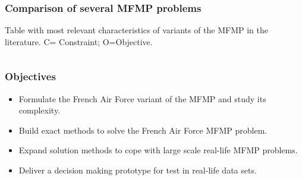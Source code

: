 \begin{frame}
\frametitle{\textbf{Comparison of several MFMP problems}}

  \begin{block}{}
    Table with most relevant characteristics of variants of the MFMP in the literature. C= Constraint; O=Objective.
  \end{block}

  \begin{columns}
    \column{\dimexpr\paperwidth-10pt}
    \begin{tiny}
      
    \end{tiny}
  \end{columns}

\end{frame}

\begin{frame}
\frametitle{\textbf{Objectives}}
  \begin{itemize}[<+->]
  \item 
    Formulate the French Air Force variant of the MFMP and study its complexity.
  \item
    Build exact methods to solve the French Air Force MFMP problem.
  \item
    Expand solution methods to cope with large scale real-life MFMP problems.
  \item
    Deliver a decision making prototype for test in real-life data sets.
  \end{itemize}
\end{frame}
 

  












